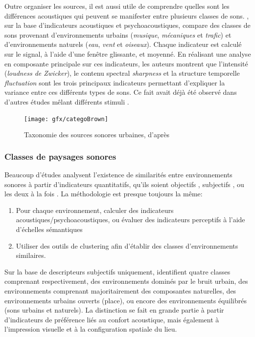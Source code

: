 Outre organiser les sources, il est aussi utile de comprendre quelles sont les différences acoustiques qui peuvent se manifester entre plusieurs classes de sons. \citep{yang2013psychoacoustical}, sur la base d'indicateurs acoustiques et psychoacoustiques, compare des classes de sons provenant d'environnements urbains (\emph{musique}, \emph{mécaniques} et \emph{trafic}) et d'environnements naturels (\emph{eau}, \emph{vent} et \emph{oiseaux}). Chaque indicateur est calculé sur le signal, à l'aide d'une fenêtre glissante, et moyenné. En réalisant une analyse en composante principale sur ces indicateurs, les auteurs montrent que l'intensité (\emph{loudness  de Zwicker}), le contenu spectral \emph{sharpness} et la structure temporelle \emph{fluctuation} sont les trois principaux indicateurs permettant d'expliquer la variance entre ces différents types de sons. Ce fait avait déjà été observé dans d'autres études mêlant différents stimuli \citep{de2006quiet,botteldooren2006temporal}.


\begin{figure}[t]
        \myfloatalign
        \texttt{[image: gfx/categoBrown]}
        \caption{Taxonomie des sources sonores urbaines, d'après \citep{brown2011towards}}\label{fig:catSoundscapeBrown}
\end{figure}

\subsubsection{Classes de paysages sonores}
\label{sec:ch3_classePaysage}

Beaucoup d'études analysent l'existence de similarités entre environnements sonores à partir d'indicateurs quantitatifs, qu'ils soient objectifs \citep{rychtarikova2013soundscape}, subjectifs \citep{jeon2013soundwalk}, ou les deux à la fois \citep{torija2013application,ricciardi2015sound}. La méthodologie est presque toujours la même:

\begin{enumerate}
\item Pour chaque environnement, calculer des indicateurs acoustiques/psychoacoustiques, ou évaluer des indicateurs perceptifs à l'aide d'échelles sémantiques
\item Utiliser des outils de clustering afin d'établir des classes d'environnements similaires.
\end{enumerate}

Sur la base de descripteurs subjectifs uniquement, \citep{jeon2013soundwalk} identifient quatre classes comprenant respectivement, des environnements dominés par le bruit urbain, des environnements comprenant majoritairement des composantes naturelles, des environnements urbains ouverts (place), ou encore des environnements équilibrés (sons urbains et naturels). La distinction se fait en grande partie à partir d'indicateurs de préférence liés au confort acoustique, mais également à l'impression visuelle et à la configuration spatiale du lieu.  

